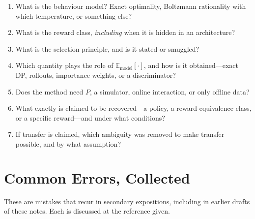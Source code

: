 \documentclass[11pt]{article}
\theoremstyle{plain}
\theoremstyle{definition}
\theoremstyle{remark}
\newcommand{\E}{\mathbb{E}}
\begin{document}
\begin{enumerate}
\item What is the behaviour model? Exact optimality, Boltzmann rationality
with which temperature, or something else?
\item What is the reward class, \emph{including} when it is hidden in an
architecture?
\item What is the selection principle, and is it stated or smuggled?
\item Which quantity plays the role of $\E_{\text{model}}[\cdot]$, and how
is it obtained---exact DP, rollouts, importance weights, or a
discriminator?
\item Does the method need $P$, a simulator, online interaction, or only
offline data?
\item What exactly is claimed to be recovered---a policy, a reward
equivalence class, or a specific reward---and under what conditions?
\item If transfer is claimed, which ambiguity was removed to make transfer
possible, and by what assumption?
\end{enumerate}

\section{Common Errors, Collected}

These are mistakes that recur in secondary expositions, including in
earlier drafts of these notes. Each is discussed at the reference given.
\end{document}
